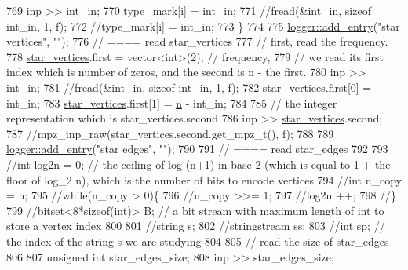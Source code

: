 \begin{DoxyCode}
769     inp >> int\_in;
770     \hyperlink{classmarked__graph__compressed_a86b00223525703e973415cbc9c94da68}{type\_mark}[i] = int\_in;
771     \textcolor{comment}{//fread(&int\_in, sizeof int\_in, 1, f);}
772     \textcolor{comment}{//type\_mark[i] = int\_in;}
773   \}
774 
775   \hyperlink{classlogger_a710163deb17bc81f70d53d285b8ac9ac}{logger::add\_entry}(\textcolor{stringliteral}{"star vertices"}, \textcolor{stringliteral}{""});
776   \textcolor{comment}{// ==== read star\_vertices}
777   \textcolor{comment}{// first, read the frequency.}
778   \hyperlink{classmarked__graph__compressed_a7a4ced4586e2e353f9076bd447df5208}{star\_vertices}.first = vector<int>(2); \textcolor{comment}{// frequency,}
779   \textcolor{comment}{// we read its first index which is number of zeros, and the second is n - the first.}
780   inp >> int\_in;
781   \textcolor{comment}{//fread(&int\_in, sizeof int\_in, 1, f);}
782   \hyperlink{classmarked__graph__compressed_a7a4ced4586e2e353f9076bd447df5208}{star\_vertices}.first[0] = int\_in;
783   \hyperlink{classmarked__graph__compressed_a7a4ced4586e2e353f9076bd447df5208}{star\_vertices}.first[1] = \hyperlink{classmarked__graph__compressed_a8d841016ddb11cfd33748c8deb6277ba}{n} - int\_in;
784 
785   \textcolor{comment}{// the integer representation which is star\_vertices.second}
786   inp >> \hyperlink{classmarked__graph__compressed_a7a4ced4586e2e353f9076bd447df5208}{star\_vertices}.second;
787   \textcolor{comment}{//mpz\_inp\_raw(star\_vertices.second.get\_mpz\_t(), f);}
788 
789   \hyperlink{classlogger_a710163deb17bc81f70d53d285b8ac9ac}{logger::add\_entry}(\textcolor{stringliteral}{"star edges"}, \textcolor{stringliteral}{""});
790 
791   \textcolor{comment}{// ==== read star\_edges}
792 
793   \textcolor{comment}{//int log2n = 0; // the ceiling of log (n+1) in base 2 (which is equal to 1 + the floor of log\_2 n),
       which is the number of bits to encode vertices}
794   \textcolor{comment}{//int n\_copy = n;}
795   \textcolor{comment}{//while(n\_copy > 0)\{}
796   \textcolor{comment}{//n\_copy >>= 1;}
797   \textcolor{comment}{//log2n ++;}
798   \textcolor{comment}{//\}}
799   \textcolor{comment}{//bitset<8*sizeof(int)> B; // a bit stream with maximum length of int to store a vertex index}
800 
801   \textcolor{comment}{//string s;}
802   \textcolor{comment}{//stringstream ss;}
803   \textcolor{comment}{//int sp; // the index of the string s we are studying }
804 
805   \textcolor{comment}{// read the size of star\_edges}
806 
807   \textcolor{keywordtype}{unsigned} \textcolor{keywordtype}{int} star\_edges\_size;
808   inp >> star\_edges\_size;

\end{DoxyCode}
